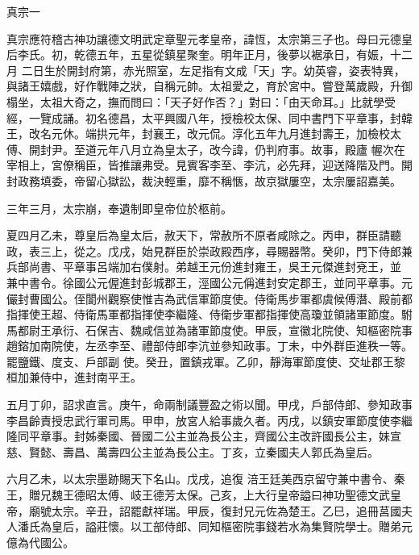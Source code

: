 
\begin{pinyinscope}

 真宗一



 真宗應符稽古神功讓德文明武定章聖元孝皇帝，諱恆，太宗第三子也。母曰元德皇后李氏。初，乾德五年，五星從鎮星聚奎。明年正月，後夢以裾承日，有娠，十二月
 二日生於開封府第，赤光照室，左足指有文成「天」字。幼英睿，姿表特異，與諸王嬉戲，好作戰陣之狀，自稱元帥。太祖愛之，育於宮中。嘗登萬歲殿，升御榻坐，太祖大奇之，撫而問曰：「天子好作否？」對曰：「由天命耳。」比就學受經，一覽成誦。初名德昌，太平興國八年，授檢校太保、同中書門下平章事，封韓王，改名元休。端拱元年，封襄王，改元侃。淳化五年九月進封壽王，加檢校太傅、開封尹。至道元年八月立為皇太子，改今諱，仍判府事。故事，殿廬
 幄次在宰相上，宮僚稱臣，皆推讓弗受。見賓客李至、李沆，必先拜，迎送降階及門。開封政務填委，帝留心獄訟，裁決輕重，靡不稱愜，故京獄屢空，太宗屢詔嘉美。



 三年三月，太宗崩，奉遺制即皇帝位於柩前。



 夏四月乙未，尊皇后為皇太后，赦天下，常赦所不原者咸除之。丙申，群臣請聽政，表三上，從之。戊戌，始見群臣於崇政殿西序，尋賜器幣。癸卯，門下侍郎兼兵部尚書、平章事呂端加右僕射。弟越王元份進封雍王，吳王元傑進封兗王，並
 兼中書令。徐國公元偓進封彭城郡王，涇國公元偁進封安定郡王，並同平章事。元儼封曹國公。侄閬州觀察使惟吉為武信軍節度使。侍衛馬步軍都虞候傅潛、殿前都指揮使王超、侍衛馬軍都指揮使李繼隆、侍衛步軍都指揮使高瓊並領諸軍節度。駙馬都尉王承衍、石保吉、魏咸信並為諸軍節度使。甲辰，宣徽北院使、知樞密院事趙鎔加南院使，左丞李至、禮部侍郎李沆並參知政事。丁未，中外群臣進秩一等。罷鹽鐵、度支、戶部副
 使。癸丑，置鎮戎軍。乙卯，靜海軍節度使、交址郡王黎桓加兼侍中，進封南平王。



 五月丁卯，詔求直言。庚午，命兩制議豐盈之術以聞。甲戌，戶部侍郎、參知政事李昌齡責授忠武行軍司馬。甲申，放宮人給事歲久者。丙戌，以鎮安軍節度使李繼隆同平章事。封姊秦國、晉國二公主並為長公主，齊國公主改許國長公主，妹宣慈、賢懿、壽昌、萬壽四公主並為長公主。丁亥，立秦國夫人郭氏為皇后。



 六月乙未，以太宗墨跡賜天下名山。戊戌，追復
 涪王廷美西京留守兼中書令、秦王，贈兄魏王德昭太傅、岐王德芳太保。己亥，上大行皇帝謚曰神功聖德文武皇帝，廟號太宗。辛丑，詔罷獻祥瑞。甲辰，復封兄元佐為楚王。乙巳，追冊莒國夫人潘氏為皇后，謚莊懷。以工部侍郎、同知樞密院事錢若水為集賢院學士。贈弟元億為代國公。




\end{pinyinscope}
